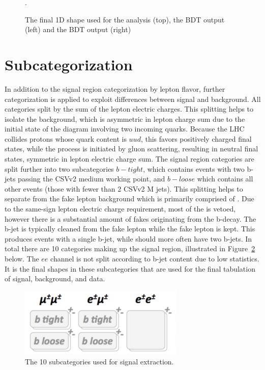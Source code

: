 \begin{figure}[htp]
\caption[Data to MC comparison of final shapes]{The final 1D shape used for the analysis (top), the \ttbar BDT output (left) and the \ttv BDT output (right)}.
\label{fig:final_shapes_prefit}
\end{figure}


\section{Subcategorization}
In addition to the signal region categorization by lepton flavor, further categorization is applied to exploit differences between signal and background. All categories
split by the sum of the lepton electric charges. This splitting helps to isolate the \ttw background, which is asymmetric in lepton charge sum due to the initial state of the
diagram involving two incoming quarks. Because the LHC collides protons whose quark content is $uud$, this favors positively charged final states, while the \tth process
is initiated by gluon scattering, resulting in neutral final states, symmetric in lepton electric charge sum.
The signal region categories
are split further into two subcategories $b-tight$, which contains events with two b-jets passing the CSVv2 medium working point, and $b-loose$ which contains all other events
(those with fewer than 2 CSVv2 M jets). This splitting helps to separate \tth from the fake lepton background which is primarily comprised of \ttbar. Due to the same-sign 
lepton electric charge requirement, most of the \ttbar is vetoed, however there is a substantial amount of fakes originating from the b-decay. The b-jet is typically cleaned
from the fake lepton while the fake lepton is kept. This produces events with a single b-jet, while \tth should more often have two b-jets. In total there are 10 categories
making up the signal region, illustrated in Figure~\ref{fig:subcats} below. The $ee$ channel is not split according to b-jet content due to low statistics. 
It is the final shapes in these subcategories that are used for the final tabulation of signal, background, and data. 

\begin{figure}[htp]
\centering
\includegraphics[width=0.7\textwidth]{ch9_figs/subcats.pdf}
\caption[Sub categories used for signal extraction]{The 10 subcategories used for signal extraction.}
\label{fig:subcats}
\end{figure}


